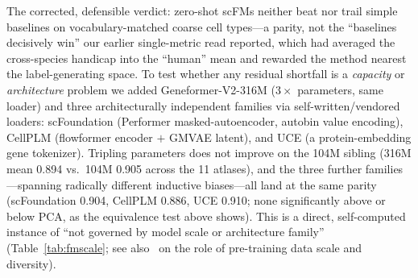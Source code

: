 \documentclass[11pt]{article}
\begin{document}
The corrected, defensible verdict: zero-shot scFMs neither beat nor trail simple baselines on vocabulary-matched coarse cell types---a parity, not the ``baselines decisively win'' our earlier single-metric read reported, which had averaged the cross-species handicap into the ``human'' mean and rewarded the method nearest the label-generating space. To test whether any residual shortfall is a \emph{capacity} or \emph{architecture} problem we added Geneformer-V2-316M ($3\times$ parameters, same loader) and three architecturally independent families via self-written/vendored loaders: scFoundation (Performer masked-autoencoder, autobin value encoding), CellPLM (flowformer encoder $+$ GMVAE latent), and UCE (a protein-embedding gene tokenizer). Tripling parameters does not improve on the 104M sibling (316M mean 0.894 vs.\ 104M 0.905 across the 11 atlases), and the three further families---spanning radically different inductive biases---all land at the same parity (scFoundation 0.904, CellPLM 0.886, UCE 0.910; none significantly above or below PCA, as the equivalence test above shows). This is a direct, self-computed instance of ``not governed by model scale or architecture family'' (Table~\ref{tab:fmscale}; see also~\cite{denadel2026} on the role of pre-training data scale and diversity).
\end{document}
